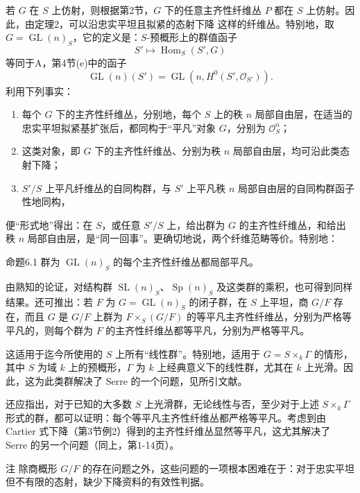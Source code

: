 若 $G$ 在 $S$ 上仿射，则根据第2节，$G$ 下的任意主齐性纤维丛 $P$ 都在 $S$ 上仿射。因此，由定理2，可以沿忠实平坦且拟紧的态射下降
这样的纤维丛。特别地，取 $G=\operatorname{GL}(n)_S$，它的定义是：$S$-预概形上的群值函子
\[
S'\longmapsto\operatorname{Hom}_S(S',G)
\]
等同于A，第4节(e)中的函子
\[
\operatorname{GL}(n)(S')=\operatorname{GL}(n,H^0(S',\mathcal O_{S'})).
\]
利用下列事实：
\begin{enumerate}[label=(\roman*)]
\item 每个 $G$ 下的主齐性纤维丛，分别地，每个 $S$ 上的秩 $n$ 局部自由层，在适当的忠实平坦拟紧基扩张后，都同构于“平凡”对象 $G$，分别为 $\mathcal O_S^n$；
\item 这类对象，即 $G$ 下的主齐性纤维丛、分别为秩 $n$ 局部自由层，均可沿此类态射下降；
\item $S'/S$ 上平凡纤维丛的自同构群，与 $S'$ 上平凡秩 $n$ 局部自由层的自同构群函子性地同构，
\end{enumerate}
便“形式地”得出：在 $S$，或任意 $S'/S$ 上，给出群为 $G$ 的主齐性纤维丛，和给出秩 $n$ 局部自由层，是“同一回事”。更确切地说，两个纤维范畴等价。特别地：
\begin{statement}{命题6.1}
群为 $\operatorname{GL}(n)_S$ 的每个主齐性纤维丛都局部平凡。
\end{statement}
由熟知的论证，对结构群 $\operatorname{SL}(n)_S$、$\operatorname{Sp}(n)_S$ 及这类群的乘积，也可得到同样结果。还可推出：若 $F$ 为 $G=\operatorname{GL}(n)_S$ 的闭子群，在 $S$ 上平坦，商 $G/F$ 存在，而且 $G$ 是 $G/F$ 上群为 $F\times_S(G/F)$ 的等平凡主齐性纤维丛，分别为严格等平凡的，则每个群为 $F$ 的主齐性纤维丛都等平凡，分别为严格等平凡。

这适用于迄今所使用的 $S$ 上所有“线性群”。特别地，适用于 $G=S\times_k\Gamma$ 的情形，其中 $S$ 为域 $k$ 上的预概形，$\Gamma$ 为 $k$ 上经典意义下的线性群，尤其在 $k$ 上光滑。因此，这为此类群解决了 Serre 的一个问题，见所引文献。

还应指出，对于已知的大多数 $S$ 上光滑群，无论线性与否，至少对于上述 $S\times_k\Gamma$ 形式的群，都可以证明：每个等平凡主齐性纤维丛都严格等平凡。考虑到由 Cartier 式下降（第3节例2）得到的主齐性纤维丛显然等平凡，这尤其解决了 Serre 的另一个问题（同上，第1-14页）。
\begin{statement}{注}
除商概形 $G/F$ 的存在问题之外，这些问题的一项根本困难在于：对于忠实平坦但不有限的态射，缺少下降资料的有效性判据。
\end{statement}

